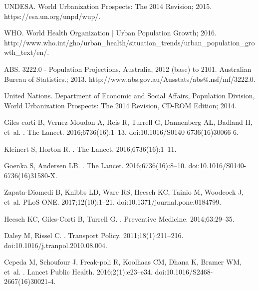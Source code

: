
UNDESA. {World Urbanization Prospects: The 2014 Revision}; 2015.
\newblock https://esa.un.org/unpd/wup/.

WHO. {World Health Organization | Urban Population Growth}; 2016.
\newblock
  http://www.who.int/gho/urban{\_}health/situation{\_}trends/urban{\_}population{\_}growth{\_}text/en/.

ABS. {3222.0 - Population Projections, Australia, 2012 (base) to 2101.
  Australian Bureau of Statistics.}; 2013.
\newblock http://www.abs.gov.au/Ausstats/abs@.nsf/mf/3222.0.

{United Nations}. {Department of Economic and Social Affairs, Population
  Division, World Urbanization Prospects: The 2014 Revision, CD-ROM Edition};
  2014.

Giles-corti B, Vernez-Moudon A, Reis R, Turrell G, Dannenberg AL, Badland H,
  et~al.
.
\newblock The Lancet. 2016;6736(16):1--13.
\newblock doi:{10.1016/S0140-6736(16)30066-6}.

Kleinert S, Horton R.
.
\newblock The Lancet. 2016;6736(16):1--11.

Goenka S, Andersen LB.
.
\newblock The Lancet. 2016;6736(16):8--10.
\newblock doi:{10.1016/S0140-6736(16)31580-X}.

Zapata-Diomedi B, Knibbs LD, Ware RS, Heesch KC, Tainio M, Woodcock J, et~al.
\newblock PLoS ONE. 2017;12(10):1--21.
\newblock doi:{10.1371/journal.pone.0184799}.

Heesch KC, Giles-Corti B, Turrell G.
.
\newblock Preventive Medicine. 2014;63:29--35.

Daley M, Rissel C.
.
\newblock Transport Policy. 2011;18(1):211--216.
\newblock doi:{10.1016/j.tranpol.2010.08.004}.

Cepeda M, Schoufour J, Freak-poli R, Koolhaas CM, Dhana K, Bramer WM, et~al.
.
\newblock Lancet Public Health. 2016;2(1):e23--e34.
\newblock doi:{10.1016/S2468-2667(16)30021-4}.

